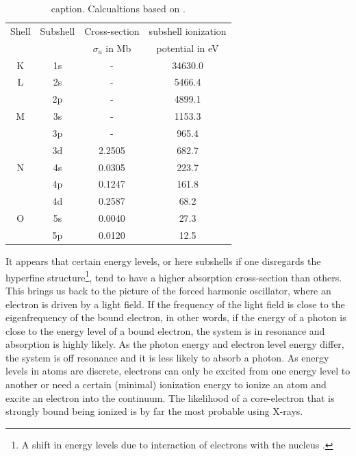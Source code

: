 \begin{table}
	\centering
		\begin{tabular}{ | c | c | c | c | }
			\hline
			Shell & Subshell & Cross-section & subshell ionization \\
				&	&	$\sigma_{a}$ in Mb & potential in eV \\ \hline
			K & 1s & - & 34630.0 \\ \hline
			L & 2s & - & 5466.4  \\ 
			\ & 2p & - & 4899.1 \\ \hline
			M & 3s & - & 1153.3  \\ 
			\ & 3p & - & 965.4 \\ 
			\ & 3d & 2.2505 & 682.7 \\ \hline
			N & 4s & 0.0305 & 223.7 \\ 
			\ & 4p & 0.1247 & 161.8 \\ 
			\ & 4d & 0.2587 & 68.2  \\ \hline
			O & 5s & 0.0040 & 27.3  \\ 
			\ & 5p & 0.0120 & 12.5  \\ \hline
		\end{tabular}
	\caption{caption. Calcualtions based on \citep{Cowan-1981-Cal}.}
	\label{tab:xenon-photoionization-cross-section}
\end{table}
It appears that certain energy levels, or here subshells if one disregards the hyperfine structure\footnote{A shift in energy levels due to interaction of electrons with the nucleus \citep[see][p~166~ff.]{Demtroder-2005-Springer}.}, tend to have a higher absorption cross-section than others. This brings us back to the picture of the forced harmonic oscillator, where an electron is driven by a light field. If the frequency of the light field is close to the eigenfrequency of the bound electron, in other words, if the energy of a photon is close to the energy level of a bound electron, the system is in resonance and absorption is highly likely. As the photon energy and electron level energy differ, the system is off resonance and it is less likely to absorb a photon. As energy levels in atoms are discrete, electrons can only be excited from one energy level to another or need a certain (minimal) ionization energy to ionize an atom and excite an electron into the continuum. The likelihood of a core-electron that is strongly bound being ionized is by far the most probable using X-rays.
